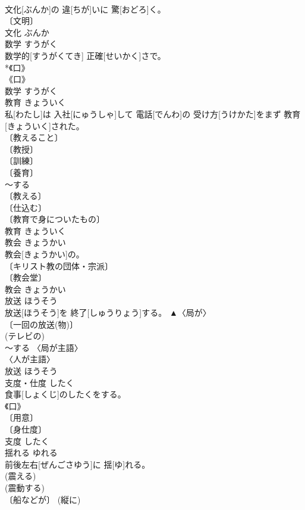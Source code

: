 \documentclass[8pt]{extreport}
\begin{document}
\begin{CJK}{UTF8}{min}
\\	文化[ぶんか]の 違[ちが]いに 驚[おどろ]く。	
\\	〔文明〕 
\\	文化	ぶんか	
\\	数学	すうがく	
\\	数学的[すうがくてき] 正確[せいかく]さで。	
\\	*《口》 
\\	《口》 
\\	数学	すうがく	
\\	教育	きょういく	
\\	私[わたし]は 入社[にゅうしゃ]して 電話[でんわ]の 受け方[うけかた]をまず 教育[きょういく]された。	
\\	〔教えること〕 
\\	〔教授〕 
\\	〔訓練〕 
\\	〔養育〕 
\\	～する 
\\	〔教える〕 
\\	〔仕込む〕 
\\	〔教育で身についたもの〕 
\\	教育	きょういく	
\\	教会	きょうかい	
\\	教会[きょうかい]の。	
\\	〔キリスト教の団体・宗派〕 
\\	〔教会堂〕 
\\	教会	きょうかい	
\\	放送	ほうそう	
\\	放送[ほうそう]を 終了[しゅうりょう]する。	▲〈局が〉 
\\	〔一回の放送(物)〕 
\\	(テレビの) 
\\	[⇒ラジオ, テレビ] ～する 〈局が主語〉 
\\	〈人が主語〉 
\\	放送	ほうそう	
\\	支度・仕度	したく	
\\	食事[しょくじ]のしたくをする。	
\\	《口》 
\\	〔用意〕 
\\	〔身仕度〕 
\\	支度	したく	
\\	揺れる	ゆれる	
\\	前後左右[ぜんごさゆう]に 揺[ゆ]れる。	
\\	(震える) 
\\	(震動する) 
\\	〔船などが〕 (縦に) 

\end{CJK}
\end{document}

